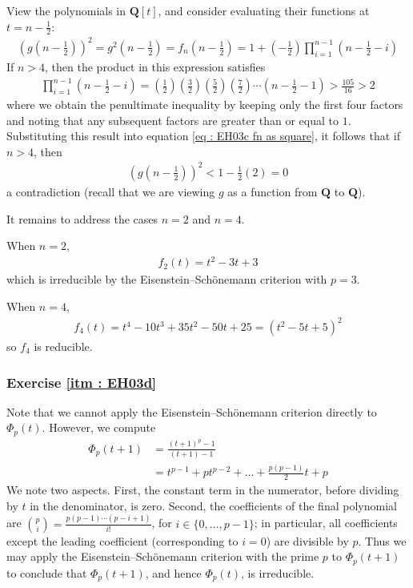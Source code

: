 \documentclass[oneside, english, 11pt]{article}
\newcommand{\Q}{\rationals}
\newcommand{\rationals}{\mathbf{Q}}
\begin{document}
{View the polynomials in $\Q[t]$, and consider evaluating their functions at $t = n - \frac{1}{2}$:
\begin{align}
\left(g\left(n - \frac{1}{2}\right)\right)^{2}
=
g^{2}\left(n - \frac{1}{2}\right)
=
f_{n}\left(n - \frac{1}{2}\right)
=
1 + \left(-\frac{1}{2}\right) \prod_{i = 1}^{n - 1} \left(n - \frac{1}{2} - i\right)%
\label{eq : EH03c fn as square}
\end{align}
If $n > 4$, then the product in this expression satisfies
\begin{align*}
\prod_{i = 1}^{n - 1} \left(n - \frac{1}{2} - i\right)
=
\left(\frac{1}{2}\right) \left(\frac{3}{2}\right) \left(\frac{5}{2}\right) \left(\frac{7}{2}\right) \cdots \left(n - \frac{1}{2} - 1\right)
>
\frac{105}{16}
>
2
\end{align*}
where we obtain the penultimate inequality by keeping only the first four factors and noting that any subsequent factors are greater than or equal to $1$. Substituting this result into equation \eqref{eq : EH03c fn as square}, it follows that if $n > 4$, then
\begin{align*}
\left(g\left(n - \frac{1}{2}\right)\right)^{2}
<
1 - \frac{1}{2} (2)
=
0
\end{align*}
a contradiction (recall that we are viewing $g$ as a function from $\Q$ to $\Q$).

It remains to address the cases $n = 2$ and $n = 4$.

When $n = 2$,
\begin{align*}
f_{2}(t)
=
t^{2} - 3 t + 3
\end{align*}
which is irreducible by the Eisenstein--Sch\"{o}nemann criterion with $p = 3$.

When $n = 4$,
\begin{align*}
f_{4}(t)
=
t^{4} - 10 t^{3} + 35 t^{2} - 50 t + 25
=
(t^{2} - 5 t + 5)^{2}
\end{align*}
so $f_{4}$ is reducible.



\subsubsection*{Exercise \ref{itm : EH03d}}

Note that we cannot apply the Eisenstein--Sch\"{o}nemann criterion directly to $\Phi_{p}(t)$. However, we compute
\begin{align*}
\Phi_{p}(t + 1)
&=
\frac{(t + 1)^{p} - 1}{(t + 1) - 1}
\\
&=
t^{p - 1} + p t^{p - 2} + \ldots + \frac{p (p - 1)}{2} t + p
\end{align*}
We note two aspects. First, the constant term in the numerator, before dividing by $t$ in the denominator, is zero. Second, the coefficients of the final polynomial are ${p \choose i} = \frac{p (p - 1) \cdots (p - i + 1)}{i!}$, for $i \in \{0, \ldots, p - 1\}$; in particular, all coefficients except the leading coefficient (corresponding to $i = 0$) are divisible by $p$. Thus we may apply the Eisenstein--Sch\"{o}nemann criterion with the prime $p$ to $\Phi_{p}(t + 1)$ to conclude that $\Phi_{p}(t + 1)$, and hence $\Phi_{p}(t)$, is irreducible.



}
\end{document}

